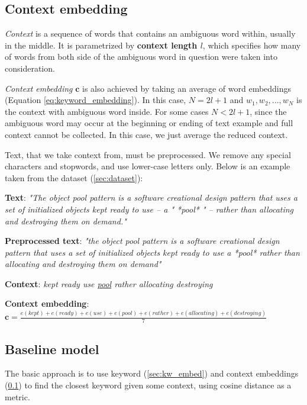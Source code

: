 \documentclass{llncs}
\begin{document}
\subsection{Context embedding}
\label{sec:ctx_embed}
\textit{Context} is a sequence of words that contains an ambiguous word within, usually in the middle.
It is parametrized by \textbf{context length \(l\)}, which specifies how many of words from both side of the ambiguous word in question were taken into consideration.

\textit{Context embedding} \(\bm{c}\) is also achieved by taking an average of word embeddings (Equation \ref{eq:keyword_embedding}).
In this case, \(N = 2l + 1\) and \(w_1, w_2, ..., w_N\) is the context with ambiguous word inside. For some cases \(N < 2l + 1\), since the ambiguous word may occur at the beginning or ending of text example and full context cannot be collected.
In this case, we just average the reduced context.

Text, that we take context from, must be preprocessed.
We remove any special characters and stopwords, and use lower-case letters only. Below is an example taken from the dataset (\ref{sec:dataset}):

\begin{tcolorbox}[
    colframe=blue!25,
    colback=white!10,
    coltitle=white!20!black,
    title={Example for keyword \textit{pool (computer science)} with context length \(l=3\)}]

\textbf{Text}:
\textit{"The object pool pattern is a software creational design pattern that uses a set of initialized objects kept ready to use – a " *pool* " – rather than allocating and destroying them on demand."}

\textbf{Preprocessed text}:
\textit{"the object pool pattern is a software creational design pattern that uses a set of initialized objects kept ready to use a *pool* rather than allocating and destroying them on demand"}

\textbf{Context}:
\textit{kept ready use \underline{pool} rather allocating destroying}

\textbf{Context embedding}:
\(\bm{c} = \frac{e(kept) + e(ready) + e(use) + e(pool) + e(rather) + e(allocating) + e(destroying)}{7}\)

\end{tcolorbox}

\subsection{Baseline model}
\label{sec:baseline_model}
The basic approach is to use keyword (\ref{sec:kw_embed}) and context embeddings (\ref{sec:ctx_embed}) to find the closest keyword given some context, using cosine distance as a metric.
\end{document}
